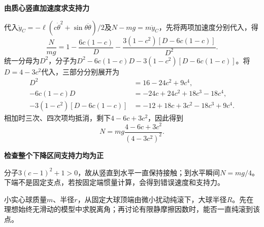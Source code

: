 \begin{solution}
\par\medskip{}\noindent\textbf{由质心竖直加速度求支持力}\par\nobreak
代入$\ddot y_C=-\ell(c\dot\theta^2+\sin\theta\ddot\theta)/2$及$N-mg=m\ddot y_C$，先将两项加速度分别代入，得
\[\frac{N}{mg}=1-\frac{6c(1-c)}D-\frac{3(1-c^2)[D-6c(1-c)]}{D^2}.\]
统一分母为$D^2$，分子为$D^2-6c(1-c)D-3(1-c^2)[D-6c(1-c)]$。将$D=4-3c^2$代入，三部分分别展开为
\begin{align*}
D^2&=16-24c^2+9c^4,\\
-6c(1-c)D&=-24c+24c^2+18c^3-18c^4,\\
-3(1-c^2)[D-6c(1-c)]&=-12+18c+3c^2-18c^3+9c^4.
\end{align*}
相加时三次、四次项均抵消，剩下$4-6c+3c^2$，因此得到
\[\boxed{N=mg\frac{4-6c+3c^2}{(4-3c^2)^2}}.\]


\par\medskip{}\noindent\textbf{检查整个下降区间支持力均为正}\par\nobreak
分子$3(c-1)^2+1>0$，故从竖直到水平一直保持接触；到水平瞬间$N=mg/4$。下端不是固定支点，若按固定端惯量计算，会得到错误速度和支持力。\end{solution}
\begin{question}\begin{example}[球沿大球外表面纯滚下]\label{em6:example:13}
小实心球质量$m$、半径$r$，从固定大球顶端由微小扰动纯滚下，大球半径$R$。先在理想始终无滑动的模型中求脱离角；再讨论有限静摩擦因数时，能否一直纯滚到该点。
\end{example}
\end{question}
